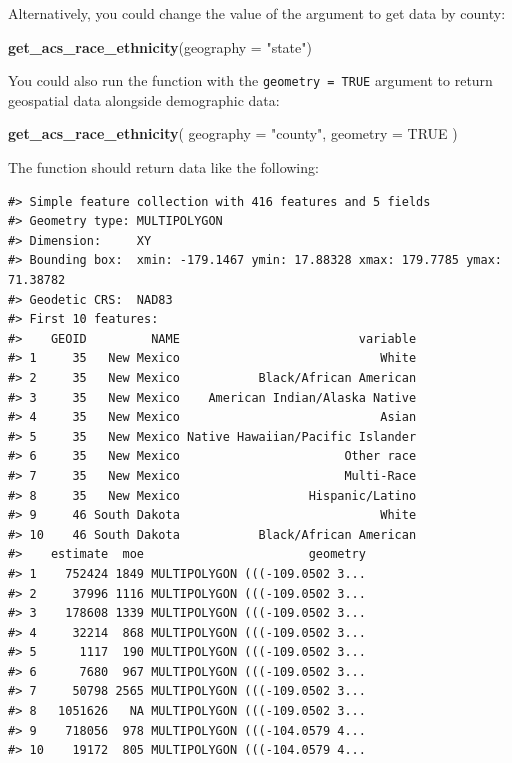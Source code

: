 \documentclass[
]{book}
\newenvironment{Shaded}{\begin{snugshade}}{\end{snugshade}}
\newcommand{\AttributeTok}[1]{\textcolor[rgb]{0.13,0.29,0.53}{#1}}
\newcommand{\ConstantTok}[1]{\textcolor[rgb]{0.56,0.35,0.01}{#1}}
\newcommand{\FunctionTok}[1]{\textcolor[rgb]{0.13,0.29,0.53}{\textbf{#1}}}
\newcommand{\NormalTok}[1]{#1}
\newcommand{\StringTok}[1]{\textcolor[rgb]{0.31,0.60,0.02}{#1}}
\begin{document}
Alternatively, you could change the value of the argument to get data by county:

\begin{Shaded}
\begin{Highlighting}[]
\FunctionTok{get\_acs\_race\_ethnicity}\NormalTok{(}\AttributeTok{geography =} \StringTok{"state"}\NormalTok{)}
\end{Highlighting}
\end{Shaded}

You could also run the function with the \texttt{geometry\ =\ TRUE} argument to return geospatial data alongside demographic data:

\begin{Shaded}
\begin{Highlighting}[]
\FunctionTok{get\_acs\_race\_ethnicity}\NormalTok{(}
  \AttributeTok{geography =} \StringTok{"county"}\NormalTok{,}
  \AttributeTok{geometry =} \ConstantTok{TRUE}
\NormalTok{)}
\end{Highlighting}
\end{Shaded}

The function should return data like the following:

\begin{verbatim}
#> Simple feature collection with 416 features and 5 fields
#> Geometry type: MULTIPOLYGON
#> Dimension:     XY
#> Bounding box:  xmin: -179.1467 ymin: 17.88328 xmax: 179.7785 ymax: 71.38782
#> Geodetic CRS:  NAD83
#> First 10 features:
#>    GEOID         NAME                         variable
#> 1     35   New Mexico                            White
#> 2     35   New Mexico           Black/African American
#> 3     35   New Mexico    American Indian/Alaska Native
#> 4     35   New Mexico                            Asian
#> 5     35   New Mexico Native Hawaiian/Pacific Islander
#> 6     35   New Mexico                       Other race
#> 7     35   New Mexico                       Multi-Race
#> 8     35   New Mexico                  Hispanic/Latino
#> 9     46 South Dakota                            White
#> 10    46 South Dakota           Black/African American
#>    estimate  moe                       geometry
#> 1    752424 1849 MULTIPOLYGON (((-109.0502 3...
#> 2     37996 1116 MULTIPOLYGON (((-109.0502 3...
#> 3    178608 1339 MULTIPOLYGON (((-109.0502 3...
#> 4     32214  868 MULTIPOLYGON (((-109.0502 3...
#> 5      1117  190 MULTIPOLYGON (((-109.0502 3...
#> 6      7680  967 MULTIPOLYGON (((-109.0502 3...
#> 7     50798 2565 MULTIPOLYGON (((-109.0502 3...
#> 8   1051626   NA MULTIPOLYGON (((-109.0502 3...
#> 9    718056  978 MULTIPOLYGON (((-104.0579 4...
#> 10    19172  805 MULTIPOLYGON (((-104.0579 4...
\end{verbatim}
\end{document}
